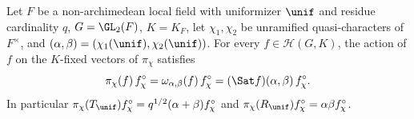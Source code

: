 Let $F$ be a non-archimedean local field with uniformizer $\unif$ and residue cardinality $q$, $G=\GL_2(F)$, $K=K_F$,
let $\chi_1,\chi_2$ be unramified quasi-characters of $F^\times$, and $(\alpha,\beta)=(\chi_1(\unif),\chi_2(\unif))$.
For every $f\in\mathcal H(G,K)$, the action of $f$ on the $K$-fixed vectors of $\pi_\chi$ satisfies
\[
  \pi_\chi(f)\,f^\circ_\chi=\omega_{\alpha,\beta}(f)\,f^\circ_\chi=(\Sat f)(\alpha,\beta)\,f^\circ_\chi .
\]
In particular $\pi_\chi(T_\unif)f^\circ_\chi=q^{1/2}(\alpha+\beta)f^\circ_\chi$ and
$\pi_\chi(R_\unif)f^\circ_\chi=\alpha\beta f^\circ_\chi$.

